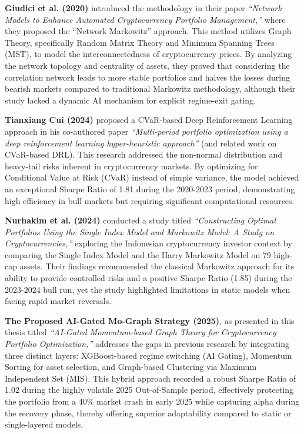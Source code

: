 \documentclass[12pt, a4paper]{article}
\begin{document}
\textbf{Giudici et al. (2020)} introduced the methodology in their paper \textit{``Network Models to Enhance Automated Cryptocurrency Portfolio Management,''} where they proposed the ``Network Markowitz'' approach. This method utilizes Graph Theory, specifically Random Matrix Theory and Minimum Spanning Trees (MST), to model the interconnectedness of cryptocurrency prices. By analyzing the network topology and centrality of assets, they proved that considering the correlation network leads to more stable portfolios and halves the losses during bearish markets compared to traditional Markowitz methodology, although their study lacked a dynamic AI mechanism for explicit regime-exit gating.

\textbf{Tianxiang Cui (2024)} proposed a CVaR-based Deep Reinforcement Learning approach in his co-authored paper \textit{``Multi-period portfolio optimization using a deep reinforcement learning hyper-heuristic approach''} (and related work on CVaR-based DRL). This research addressed the non-normal distribution and heavy-tail risks inherent in cryptocurrency markets. By optimizing for Conditional Value at Risk (CVaR) instead of simple variance, the model achieved an exceptional Sharpe Ratio of 1.81 during the 2020-2023 period, demonstrating high efficiency in bull markets but requiring significant computational resources.

\textbf{Nurhakim et al. (2024)} conducted a study titled \textit{``Constructing Optimal Portfolios Using the Single Index Model and Markowitz Model: A Study on Cryptocurrencies,''} exploring the Indonesian cryptocurrency investor context by comparing the Single Index Model and the Harry Markowitz Model on 79 high-cap assets. Their findings recommended the classical Markowitz approach for its ability to provide controlled risks and a positive Sharpe Ratio (1.85) during the 2023-2024 bull run, yet the study highlighted limitations in static models when facing rapid market reversals.

\textbf{The Proposed AI-Gated Mo-Graph Strategy (2025)}, as presented in this thesis titled \textit{``AI-Gated Momentum-based Graph Theory for Cryptocurrency Portfolio Optimization,''} addresses the gaps in previous research by integrating three distinct layers: XGBoost-based regime switching (AI Gating), Momentum Sorting for asset selection, and Graph-based Clustering via Maximum Independent Set (MIS). This hybrid approach recorded a robust Sharpe Ratio of 1.02 during the highly volatile 2025 Out-of-Sample period, effectively protecting the portfolio from a 40\% market crash in early 2025 while capturing alpha during the recovery phase, thereby offering superior adaptability compared to static or single-layered models.
\end{document}
